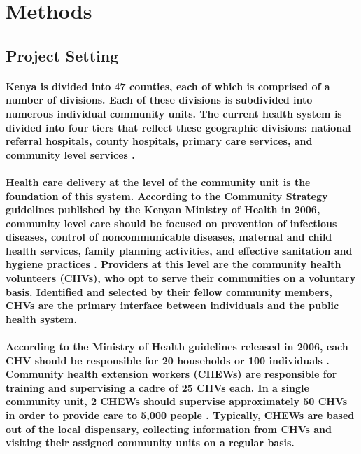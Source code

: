 \section{Methods}
\subsection{Project Setting}
\paragraph{Kenya is divided into 47 counties, each of which is comprised of a number of divisions. Each of these divisions is subdivided into numerous individual community units. The current health system is divided into four tiers that reflect these geographic divisions: national referral hospitals, county hospitals, primary care services, and community level services \citep{SPA2010}.}

\paragraph{Health care delivery at the level of the community unit is the foundation of this system. According to the Community Strategy guidelines published by the Kenyan Ministry of Health in 2006, community level care should be focused on prevention of infectious diseases, control of noncommunicable diseases, maternal and child health services, family planning activities, and effective sanitation and hygiene practices \citep{CommunityStrategy2006}. Providers at this level are the community  health volunteers (CHVs), who opt to serve their communities on a voluntary basis. Identified and selected by their fellow community members, CHVs are the primary interface between individuals and the public health system.}

\paragraph{According to the Ministry of Health guidelines released in 2006, each CHV should be responsible for 20 households or 100 individuals \citep{CommunityStrategy2006}. Community health extension workers (CHEWs) are responsible for training and supervising a cadre of 25 CHVs each. In a single community unit, 2 CHEWs should supervise approximately 50 CHVs in order to provide care to 5,000 people \citep{CommunityStrategy2006}. Typically, CHEWs are based out of the local dispensary, collecting information from CHVs and visiting their assigned community units on a regular basis.}

